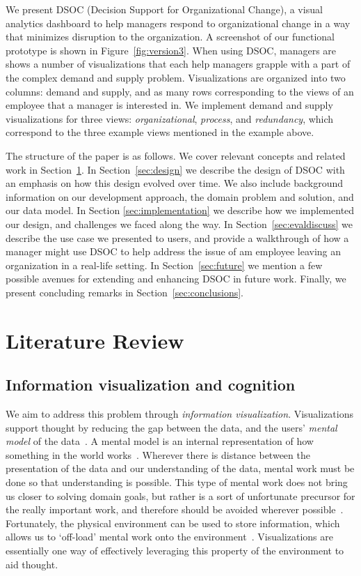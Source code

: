 \documentclass[journal]{vgtc}                %
\begin{document}
We present DSOC (Decision Support for Organizational Change), a visual analytics dashboard to help managers respond to organizational change in a way that minimizes disruption to the organization. A screenshot of our functional prototype is shown in Figure~\ref{fig:version3}. When using DSOC, managers are shows a number of visualizations that each help managers grapple with a part of the complex demand and supply problem. Visualizations are organized into two columns: demand and supply, and as many rows corresponding to the views of an employee that a manager is interested in. We implement demand and supply visualizations for three views: \emph{organizational}, \emph{process}, and \emph{redundancy}, which correspond to the three example views mentioned in the example above. 

The structure of the paper is as follows. We cover relevant concepts and related work in Section~\ref{sec:litreview}. In Section~\ref{sec:design} we describe the design of DSOC with an emphasis on how this design evolved over time. We also include background information on our development approach, the domain problem and solution, and our data model. In Section \ref{sec:implementation} we describe how we implemented our design, and challenges we faced along the way. In Section~\ref{sec:evaldiscuss} we describe the use case we presented to users, and provide a walkthrough of how a manager might use DSOC to help address the issue of am employee leaving an organization in a real-life setting. In Section~\ref{sec:future} we mention a few possible avenues for extending and enhancing DSOC in future work. Finally, we present concluding remarks in Section~\ref{sec:conclusions}.

\section{Literature Review}
\label{sec:litreview}

\subsection{Information visualization and cognition}

We aim to address this problem through \emph{information visualization}. Visualizations support thought by reducing the gap between the data, and the users' \emph{mental model} of the data~\cite{yi2007toward}. A mental model is an internal representation of how something in the world works~\cite{staggersmodel,norman2014some}. Wherever there is distance between the presentation of the data and our understanding of the data, mental work must be done so that understanding is possible. This type of mental work does not bring us closer to solving domain goals, but rather is a sort of unfortunate precursor for the really important work, and therefore should be avoided wherever possible~\cite{paas2003cognitive}. Fortunately, the physical environment can be used to store information, which allows us to \lq off-load\rq{} mental work onto the environment~\cite{wilson2002six}. Visualizations are essentially one way of effectively leveraging this property of the environment to aid thought.
\end{document}
